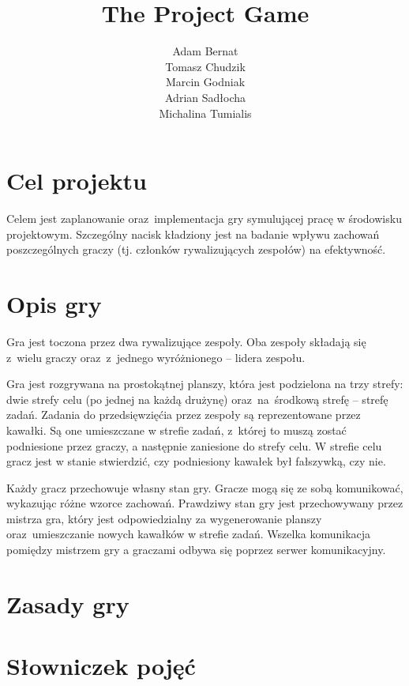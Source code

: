 \documentclass[a4paper]{article}
\title{The Project Game}
\author{
Adam Bernat \\
Tomasz Chudzik \\
Marcin Godniak \\
Adrian Sadłocha \\
Michalina Tumialis
}
\begin{document}
\maketitle
\tableofcontents
\newpage

\listoftodos
\newpage

\section{Cel projektu}

Celem jest zaplanowanie oraz~implementacja gry symulującej pracę w środowisku projektowym.
Szczególny nacisk kładziony jest na badanie wpływu zachowań poszczególnych graczy (tj. członków rywalizujących zespołów) na efektywność.

\section{Opis gry}

Gra jest toczona przez dwa rywalizujące zespoły.
Oba zespoły składają się z~wielu graczy oraz~z~jednego wyróżnionego -- lidera zespołu.

Gra jest rozgrywana na prostokątnej planszy, która jest podzielona na trzy strefy: dwie strefy celu (po jednej na każdą drużynę) oraz~na~środkową strefę -- strefę zadań.
Zadania do przedsięwzięćia przez zespoły są reprezentowane przez kawałki.
Są one umieszczane w strefie zadań, z~której to muszą zostać podniesione przez graczy, a następnie zaniesione do strefy celu.
W strefie celu gracz jest w stanie stwierdzić, czy podniesiony kawałek był fałszywką, czy nie.

Każdy gracz przechowuje własny stan gry.
Gracze mogą się ze sobą komunikować, wykazując różne wzorce zachowań.
Prawdziwy stan gry jest przechowywany przez mistrza gra, który jest odpowiedzialny za wygenerowanie planszy oraz~umieszczanie nowych kawałków w strefie zadań.
Wszelka komunikacja pomiędzy mistrzem gry a graczami odbywa się poprzez serwer komunikacyjny.

\section{Zasady gry}

\section{Słowniczek pojęć}

\end{document}

